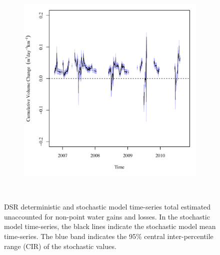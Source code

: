 \begin{landscape}
\begin{figure}
\begin{subfigure}{0.7\textwidth}
			\includegraphics[width=\tableCustomSize]{"Figures/Results_DSR/Stochastic/Balance Water"}
		\end{subfigure}\\
		\caption[DSR deterministic and stochastic model time-series total estimated unaccounted for non-point water gains and losses.]{DSR deterministic and stochastic model time-series total estimated unaccounted for non-point water gains and losses.  In the stochastic model time-series, the black lines indicate the stochastic model mean time-series.  The blue band indicates the 95\% central inter-percentile range (CIR) of the stochastic values.}
		\label{fig:reachWater_DS}
	\end{figure}
\end{landscape}

